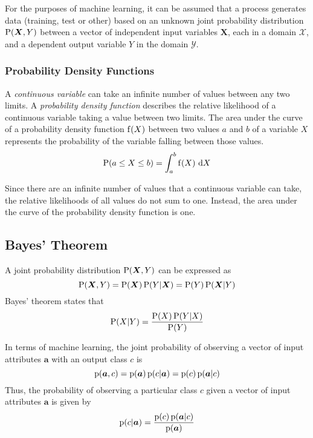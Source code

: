 For the purposes of machine learning, it can be assumed that a process generates data (training, test or other) based on an unknown joint probability distribution \( \mathrm{P}\!\left( \boldsymbol{X}, Y \right) \) between a vector of independent input variables \( \boldsymbol{X} \), each in a domain \( \mathcal{X} \), and a dependent output variable \( Y \) in the domain \( \mathcal{Y} \).

\subsubsection{Probability Density Functions}

A \emph{continuous variable} can take an infinite number of values between any two limits.
A \emph{probability density function} describes the relative likelihood of a continuous variable taking a value between two limits.
The area under the curve of a probability density function \( \mathrm{f}\!\left( X \right) \) between two values \( a \) and \( b \) of a variable \( X \) represents the probability of the variable falling between those values.
\begin{equation*}
  \mathrm{P}\!\left( a \leq X \leq b \right) = \int_{a}^{b} \mathrm{f}\!\left( X \right)\, \mathrm{d} X
\end{equation*}

Since there are an infinite number of values that a continuous variable can take, the relative likelihoods of all values do not sum to one.
Instead, the area under the curve of the probability density function is one.

\subsection{Bayes' Theorem}

A joint probability distribution \( \mathrm{P}\!\left( \boldsymbol{X}, Y \right) \) can be expressed as
\begin{equation*}
  \mathrm{P}\!\left( \boldsymbol{X}, Y \right) = \mathrm{P}\!\left( \boldsymbol{X} \right) \mathrm{P}\!\left( Y \vert \boldsymbol{X} \right) = \mathrm{P}\!\left( Y \right) \mathrm{P}\!\left( \boldsymbol{X} \vert Y \right)
\end{equation*}
Bayes' theorem states that
\begin{equation*}
  \mathrm{P}\!\left( X \vert Y \right) = \frac{\mathrm{P}\!\left( X \right) \mathrm{P}\!\left( Y \vert X \right)}{\mathrm{P}\!\left( Y \right)}
\end{equation*}

In terms of machine learning, the joint probability of observing a vector of input attributes \( \boldsymbol{a} \) with an output class \( c \) is
\begin{equation*}
  \mathrm{p}\!\left( \boldsymbol{a}, c \right) = \mathrm{p}\!\left( \boldsymbol{a} \right) \mathrm{p}\!\left( c \vert \boldsymbol{a} \right) = \mathrm{p}\!\left( c \right) \mathrm{p}\!\left( \boldsymbol{a} \vert c \right)
\end{equation*}
Thus, the probability of observing a particular class \( c \) given a vector of input attributes \( \boldsymbol{a} \) is given by
\begin{equation*}
  \mathrm{p}\!\left( c \vert \boldsymbol{a} \right) = \frac{\mathrm{p}\!\left( c \right) \mathrm{p}\!\left( \boldsymbol{a} \vert c \right)}{\mathrm{p}\!\left( \boldsymbol{a} \right)}
\end{equation*}

